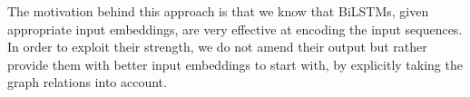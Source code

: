 \documentclass[11pt,a4paper]{article}
\begin{document}
The motivation behind this approach is that we know that BiLSTMs, given appropriate input embeddings, are very effective at encoding the input sequences. In order to exploit their strength, we do not amend their output but rather provide them with better input embeddings to start with, by explicitly taking the graph relations into account. 

\end{document}
